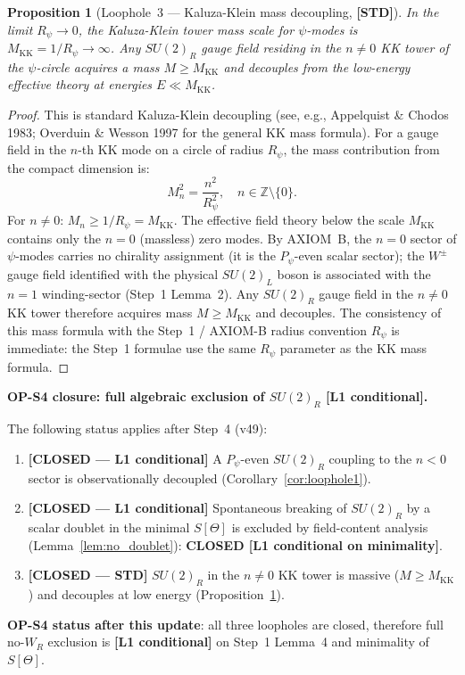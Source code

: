 \documentclass[12pt,a4paper]{article}
\newtheorem{proposition}[theorem]{Proposition}
\theoremstyle{definition}
\theoremstyle{remark}
\begin{document}
\begin{proposition}[Loophole~3 — Kaluza-Klein mass decoupling, \textbf{[STD]}]
\label{prop:loophole3}
In the limit $R_\psi \to 0$, the Kaluza-Klein tower mass scale for $\psi$-modes
is $M_{\mathrm{KK}} = 1/R_\psi \to \infty$.
Any $SU(2)_R$ gauge field residing in the $n\neq 0$ KK tower of the
$\psi$-circle acquires a mass $M \geq M_{\mathrm{KK}}$ and decouples from
the low-energy effective theory at energies $E \ll M_{\mathrm{KK}}$.
\end{proposition}

\begin{proof}
This is standard Kaluza-Klein decoupling (see, e.g., Appelquist \& Chodos 1983;
Overduin \& Wesson 1997 for the general KK mass formula).
For a gauge field in the $n$-th KK mode on a circle of radius $R_\psi$,
the mass contribution from the compact dimension is:
\begin{equation}
  M_n^2 = \frac{n^2}{R_\psi^2}, \quad n \in \mathbb{Z}\setminus\{0\}.
\end{equation}
For $n\neq 0$: $M_n \geq 1/R_\psi = M_{\mathrm{KK}}$.
The effective field theory below the scale $M_{\mathrm{KK}}$ contains only
the $n=0$ (massless) zero modes.
By AXIOM~B, the $n=0$ sector of $\psi$-modes carries no chirality assignment
(it is the $P_\psi$-even scalar sector); the $W^\pm$ gauge field identified with
the physical $SU(2)_L$ boson is associated with the $n=1$ winding-sector
(Step~1 Lemma~2).
Any $SU(2)_R$ gauge field in the $n\neq 0$ KK tower therefore acquires mass
$M\geq M_{\mathrm{KK}}$ and decouples.
The consistency of this mass formula with the Step~1 / AXIOM-B radius convention
$R_\psi$ is immediate: the Step~1 formulae use the same $R_\psi$ parameter as
the KK mass formula.
\end{proof}

\begin{gapbox}
  \textbf{OP-S4 closure: full algebraic exclusion of $SU(2)_R$ [L1 conditional].}

  The following status applies after Step~4 (v49):
  \begin{enumerate}
    \item \textbf{[CLOSED — L1 conditional]}
          A $P_\psi$-even $SU(2)_R$ coupling to the $n<0$ sector is
          observationally decoupled (Corollary~\ref{cor:loophole1}).
    \item \textbf{[CLOSED — L1 conditional]}
          Spontaneous breaking of $SU(2)_R$ by a scalar doublet in the minimal
          $S[\Theta]$ is excluded by field-content analysis
          (Lemma~\ref{lem:no_doublet}): \textbf{CLOSED [L1 conditional on minimality]}.
    \item \textbf{[CLOSED — STD]}
          $SU(2)_R$ in the $n\neq 0$ KK tower is massive ($M\geq M_{\mathrm{KK}}$)
          and decouples at low energy (Proposition~\ref{prop:loophole3}).
  \end{enumerate}
  \textbf{OP-S4 status after this update}: all three loopholes are closed,
  therefore full no-$W_R$ exclusion is \textbf{[L1 conditional]} on
  Step~1 Lemma~4 and minimality of $S[\Theta]$.
\end{gapbox}
\end{document}
